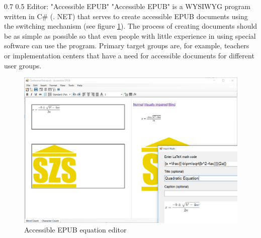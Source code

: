 \documentclass{llncs}
\makeatletter
\renewcommand\subsection{\@startsection 
   {subsection}{2}{0mm}%
   {0.7\baselineskip}%
   {0.5\baselineskip}%
   {\bfseries\large}%
   }
\makeatother
\begin{document}

\subsection{Editor: "Accessible EPUB"}
"Accessible EPUB" is a WYSIWYG program written in C\# (. NET) that serves to create accessible EPUB documents using the switching mechanism (see figure \ref{fig:editor}). The process of creating documents should be as simple as possible so that even people with little experience in using special software can use the program. Primary target groups are, for example, teachers or implementation centers that have a need for accessible documents for different user groups. 

\begin{figure}[h]
	\centering
	\includegraphics[width=\linewidth]{AccessibleEPUBequationNew.PNG}
	\caption{Accessible EPUB equation editor}
	\label{fig:editor}
\end{figure}
\end{document}
